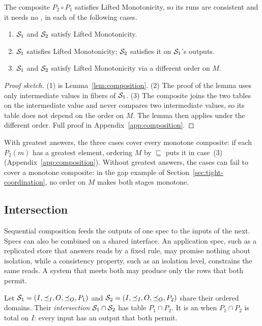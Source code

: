 \begin{proposition}
\label{prop:joint-monotone}
The composite $P_2\circ P_1$ satisfies Lifted Monotonicity, so its runs are
consistent and it needs no \commitment, in each of the following cases.
\begin{enumerate}
  \item $\mathcal{S}_1$ and $\mathcal{S}_2$ satisfy Lifted Monotonicity.
  \item $\mathcal{S}_1$ satisfies Lifted Monotonicity; $\mathcal{S}_2$ satisfies it on
        $\mathcal{S}_1$'s outputs.
  \item $\mathcal{S}_1$ and $\mathcal{S}_2$ satisfy Lifted Monotonicity via a different order
        on $M$.
\end{enumerate}
\end{proposition}

\begin{proof}[Proof sketch]
(1) is Lemma~\ref{lem:composition}.  (2) The proof of the lemma uses only
intermediate values in fibers of $\mathcal{S}_1$.  (3) The composite joins the two
tables on the intermediate value and never compares two intermediate values, so
its table does not depend on the order on $M$.  The lemma then applies under
the different order.  Full proof in Appendix~\ref{app:composition}.
\end{proof}

With greatest answers, the three cases cover every monotone composite: if each
$P_2(m)$ has a greatest element, ordering $M$ by $\sqsubseteq$ puts it in
case~(3) (Appendix~\ref{app:composition}).  Without greatest answers, the
cases can fail to cover a monotone composite: in the gap example of
Section~\ref{sec:tight-coordination}, no order on $M$ makes both stages
monotone.

\subsection{Intersection}
\label{sec:intersection}

Sequential composition feeds the outputs of one spec to the inputs of the
next.  Specs can also be combined on a shared interface.  An application spec,
such as a replicated store that answers reads by a fixed rule, may promise
nothing about isolation, while a consistency property, such as an isolation
level, constrains the same reads.  A system that meets both may produce only
the rows that both permit.

\begin{definition}[Intersection]
\label{def:intersection}
Let $\mathcal{S}_1=(I,\preceq_I,O,\preceq_O,P_1)$ and
$\mathcal{S}_2=(I,\preceq_I,O,\preceq_O,P_2)$ share their ordered domains.  Their
\emph{intersection} $\mathcal{S}_1\cap\mathcal{S}_2$ has table $P_1\cap P_2$.  It is an
\spectype when $P_1\cap P_2$ is total on $I$: every input has an output that
both permit.
\end{definition}

